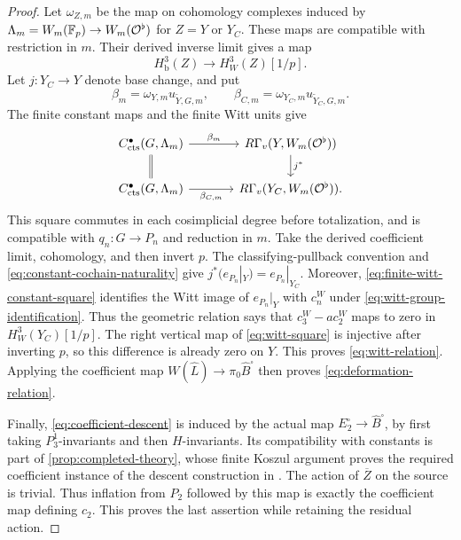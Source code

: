 \begin{proof}
Let $\omega_{Z,m}$ be the map on cohomology complexes induced by
$\Lambda_m=W_m(\mathbb F_p)\to W_m(\mathcal O^\flat)$ for $Z=Y$ or $Y_C$.
These maps are compatible with restriction in $m$.  Their derived
inverse limit gives a map
\[
 H^3_{\mathrm b}(Z)\longrightarrow H_W^3(Z)[1/p].
\]
Let $j:Y_C\to Y$ denote base change, and put
\[
 \beta_m=\omega_{Y,m}u_{\widetilde Y,G,m},\qquad
 \beta_{C,m}=\omega_{Y_C,m}u_{\widetilde Y_C,G,m}.
\]
The finite constant maps and the finite Witt units give
\begin{equation}\label{eq:finite-witt-base-change}
\begin{tikzcd}[column sep=large]
 C_{\cts}^{\bullet}(G,\Lambda_m)
      \arrow[r,"\beta_m"] \arrow[d,equal]
   &R\Gamma_v(Y,W_m(\cO^\flat))\arrow[d,"j^*"]\\
 C_{\cts}^{\bullet}(G,\Lambda_m)
      \arrow[r,"\beta_{C,m}"']
   &R\Gamma_v(Y_C,W_m(\cO^\flat)).
\end{tikzcd}
\end{equation}
This square commutes in each cosimplicial degree before totalization,
and is compatible with $q_n:G\to P_n$ and reduction in $m$.
Take the derived coefficient limit, cohomology, and then invert $p$.
The classifying-pullback convention and
\eqref{eq:constant-cochain-naturality} give
$j^*(e_{P_n}|_Y)=e_{P_n}|_{Y_C}$. Moreover,
\eqref{eq:finite-witt-constant-square} identifies the Witt image of
$e_{P_n}|_Y$ with $c_n^W$ under
\eqref{eq:witt-group-identification}. Thus the geometric relation says
that $c_3^W-a c_2^W$ maps to zero in $H_W^3(Y_C)[1/p]$.
The right vertical map of \eqref{eq:witt-square} is injective after
inverting $p$, so this difference is already zero on $Y$. This proves
\eqref{eq:witt-relation}. Applying the coefficient map
$W(\widehat L)\to\pi_0\widehat B^{\square}$ then proves
\eqref{eq:deformation-relation}.

Finally, \eqref{eq:coefficient-descent} is induced by the actual map
$E_2^{\square}\to\widehat B^{\square}$, by first taking
$P_3^1$-invariants and then $H$-invariants.  Its compatibility with
constants is part of \cref{prop:completed-theory}, whose finite Koszul
argument proves the required coefficient instance of the descent
construction in \cite[Proposition~4.6.12]{BMR2026}.
The action of $\overline Z$ on the source is trivial.  Thus
inflation from $P_2$ followed by this map is exactly the coefficient
map defining $c_2$.  This proves the last assertion while retaining
the residual action.
\end{proof}

